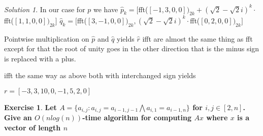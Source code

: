 \documentclass[a4paper,twoside=false,abstract=false,numbers=noenddot,
titlepage=false,headings=small,parskip=half,version=last]{scrartcl}
\theoremstyle{definition}
\newtheorem{exercise}{Exercise}
\theoremstyle{remark}
\newtheorem*{solution}{Solution}
\begin{document}
\begin{solution}
In our case for $p$ we have 
$\hat{p}_k = [$fft($[-1,3,0,0])_{2k}+(\sqrt{2}-\sqrt{2}i)^k\cdot$fft($[1,1,0,0])_{2k}]$ 
$\hat{q}_k = [$fft($[3,-1,0,0])_{2k},(\sqrt{2}-\sqrt{2}i)^k\cdot$fft($[0,2,0,0])_{2k}]$ 

Pointwise multiplication on $\hat{p}$ and $\hat{q}$ yields $\hat{r}$
ifft are almost the same thing as fft except for that the root of unity 
goes in the other direction that is the minus sign is replaced with a plus.


ifft the same way as above both with interchanged sign yields

$r =[-3,3,10,0,-1,5,2,0]$  

\end{solution}
\begin{exercise}
{\bf
Let $A = \{ a_{i,j} : a_{i,j} = a_{i-1,j-1} \bigwedge a_{i,1} = a_{i-1,n} \}$
for $i,j \in [2,n]$. 
Give an $O(n log(n))$-time algorithm for computing $Ax$ where $x$ is a vector of length $n$
}
\end{exercise}
\end{document}
